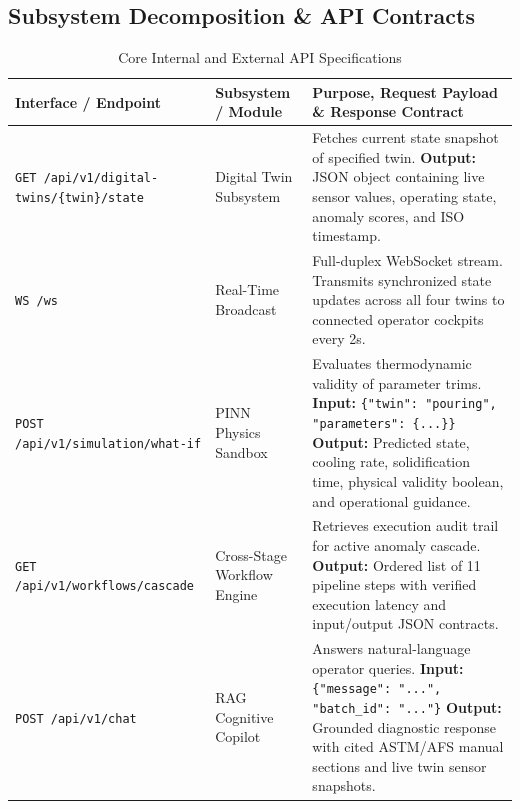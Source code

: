 \documentclass[11pt, a4paper]{article}
\begin{document}
\subsection{Subsystem Decomposition \& API Contracts}
\begin{table}[H]
    \centering
    \footnotesize
    \renewcommand{\arraystretch}{1.25}
    \begin{tabular}{|p{3.6cm}|p{3.8cm}|p{6.2cm}|}
        \hline
        \textbf{Interface / Endpoint} & \textbf{Subsystem / Module} & \textbf{Purpose, Request Payload \& Response Contract} \\
        \hline
        \texttt{GET /api/v1/digital-twins/\{twin\}/state} & Digital Twin Subsystem & Fetches current state snapshot of specified twin. \newline \textbf{Output:} JSON object containing live sensor values, operating state, anomaly scores, and ISO timestamp. \\
        \hline
        \texttt{WS /ws} & Real-Time Broadcast & Full-duplex WebSocket stream. Transmits synchronized state updates across all four twins to connected operator cockpits every 2s. \\
        \hline
        \texttt{POST /api/v1/simulation/what-if} & PINN Physics Sandbox & Evaluates thermodynamic validity of parameter trims. \newline \textbf{Input:} \texttt{\{"twin": "pouring", "parameters": \{...\}\}} \newline \textbf{Output:} Predicted state, cooling rate, solidification time, physical validity boolean, and operational guidance. \\
        \hline
        \texttt{GET /api/v1/workflows/cascade} & Cross-Stage Workflow Engine & Retrieves execution audit trail for active anomaly cascade. \newline \textbf{Output:} Ordered list of 11 pipeline steps with verified execution latency and input/output JSON contracts. \\
        \hline
        \texttt{POST /api/v1/chat} & RAG Cognitive Copilot & Answers natural-language operator queries. \newline \textbf{Input:} \texttt{\{"message": "...", "batch\_id": "..."\}} \newline \textbf{Output:} Grounded diagnostic response with cited ASTM/AFS manual sections and live twin sensor snapshots. \\
        \hline
    \end{tabular}
    \caption{Core Internal and External API Specifications}
\end{table}
\end{document}
